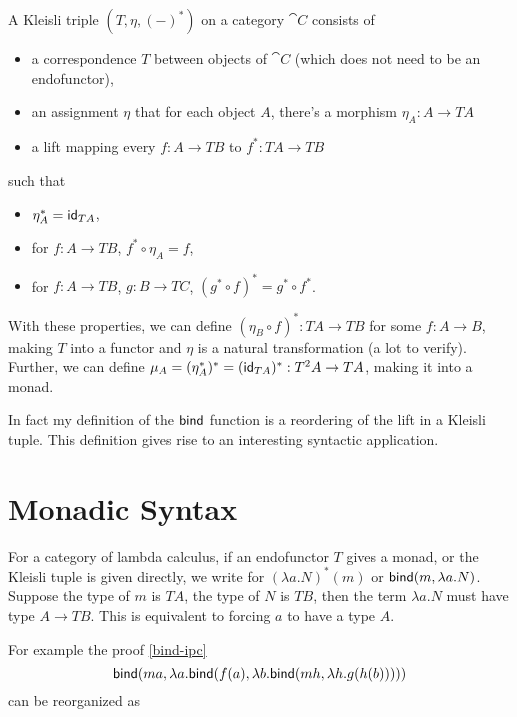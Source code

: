 \begin{definition}
    A Kleisli triple $(T,\eta,(-)^\ast)$ on a category $\cat{C}$ 
    consists of 
    \begin{itemize}
        \item a correspondence $T$ between objects of $\cat{C}$ (which
        does not need to be an endofunctor), 
        \item an assignment $\eta$ that for
        each object $A$, there's a morphism $\eta_A: A\to TA$
        \item a lift mapping every $f:A\to TB$ to $f^\ast:TA\to TB$
    \end{itemize}
    such that
    \begin{itemize}
        \item $\eta_A^\ast=\text{\sf id}_{TA}$,
        \item for $f:A\to TB$, $f^\ast\circ\eta_A=f$,
        \item for $f:A\to TB$, $g:B\to TC$, $(g^\ast\circ f)
        ^\ast=g^\ast\circ f^\ast$.
    \end{itemize}
    With these properties, we can define $(\eta_B\circ f)^\ast:TA\to TB$
    for some $f:A\to B$, making $T$ into a functor and $\eta$ is a
    natural transformation (a lot to verify). 
    Further, we can define $\mu_A=(\eta_A^\ast)^\ast=(\text{\sf id}_{TA})^\ast: 
    T^2A\to TA$, making it into a monad. 
\end{definition}

In fact my definition of the $\text{\sf bind}$ function is a reordering of the lift
in a Kleisli tuple. This definition gives rise to an interesting 
syntactic application.

\section{Monadic Syntax}

For a category of lambda calculus, if an endofunctor $T$ gives
a monad, or the Kleisli tuple is given directly, we write
for $(\lambda a. N)^\ast(m)$ or $\text{\sf bind}(m,\lambda a.N)$.
Suppose the type of $m$ is $TA$, the type of $N$ is $TB$, then the
term $\lambda a.N$ must have type $A\to TB$. This is equivalent
to forcing $a$ to have a type $A$.

For example the proof \eqref{bind-ipc}
$$
\text{\sf bind}(ma,\lambda a.\text{\sf bind}(f(a),\lambda b.\text{\sf bind}(mh,\lambda h.g(h(b)))))
$$
can be reorganized as

